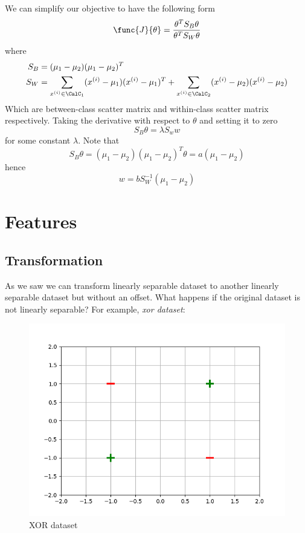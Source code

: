 We can simplify our objective to have the following form
\begin{equation*}
    \func{J}{\theta} = \dfrac{\theta^T S_B \theta}{\theta^T S_W \theta }
\end{equation*}
where 
\begin{align*}
    S_B &= (\mu_1 - \mu_2) (\mu_1 - \mu_2)^T\\
    S_W &= \sum_{x^{(i)} \in \CalC_1} (x^{(i)} - \mu_1)(x^{(i)} - \mu_1)^T + \sum_{x^{(i)} \in \CalC_2} (x^{(i)} - \mu_2)(x^{(i)} - \mu_2)
\end{align*}
Which are between-class scatter matrix and within-class scatter matrix respectively. Taking the derivative with respect to \(\theta\) and setting it to zero 
\begin{equation*}
    S_B \theta = \lambda S_w w
\end{equation*}
for some constant \(\lambda\). Note that 
\begin{equation*}
    S_B \theta = (\mu_1 - \mu_2) (\mu_1 - \mu_2)^T \theta = a (\mu_1 - \mu_2)
\end{equation*}
hence 
\begin{equation*}
    w = b S_W^{-1} (\mu_1 - \mu_2)
\end{equation*}

\section{Features}
\subsection{Transformation}
As we saw we can transform linearly separable dataset to another linearly separable dataset but without an offset. What happens if the original dataset is not linearly separable? For example, \textit{xor dataset}:
\begin{figure}[!ht]
    \centering
    \includegraphics{Chapters/graphics/xor_dataset.png}
    \caption{XOR dataset}
\end{figure}

